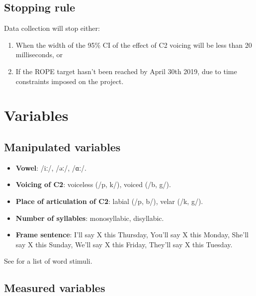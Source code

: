 \documentclass[11pt,]{article}
\providecommand{\tightlist}{%
  \setlength{\itemsep}{0pt}\setlength{\parskip}{0pt}}
\begin{document}
\hypertarget{stopping-rule}{%
\subsection{Stopping rule}\label{stopping-rule}}

Data collection will stop either:

\begin{enumerate}
\def\labelenumi{(\alph{enumi})}
\tightlist
\item
  When the width of the 95\% CI of the effect of C2 voicing will be less
  than 20 milliseconds, or
\item
  If the ROPE target hasn't been reached by April 30th 2019, due to time
  constraints imposed on the project.
\end{enumerate}

\hypertarget{variables}{%
\section{Variables}\label{variables}}

\hypertarget{manipulated-variables}{%
\subsection{Manipulated variables}\label{manipulated-variables}}

\label{s:manipulated}

\begin{itemize}
\tightlist
\item
  \textbf{Vowel}: /iː/, /əː/, /ɑː/.
\item
  \textbf{Voicing of C2}: voiceless (/p, k/), voiced (/b, g/).
\item
  \textbf{Place of articulation of C2}: labial (/p, b/), velar (/k, g/).
\item
  \textbf{Number of syllables}: monosyllabic, disyllabic.
\item
  \textbf{Frame sentence}: I'll say X this Thursday, You'll say X this
  Monday, She'll say X this Sunday, We'll say X this Friday, They'll say
  X this Tuesday.
\end{itemize}

See  for a list of word stimuli.

\hypertarget{measured-variables}{%
\subsection{Measured variables}\label{measured-variables}}
\end{document}

